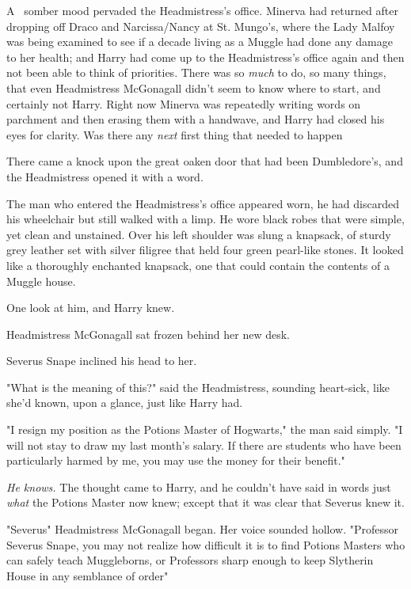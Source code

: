 
\lettrine{A}{~} somber mood
pervaded the Headmistress's office. Minerva had returned after dropping off
Draco and Narcissa/Nancy at St. Mungo's, where the Lady Malfoy was being
examined to see if a decade living as a Muggle had done any damage to her
health; and Harry had come up to the Headmistress's office again and
then{\el} not been able to think of priorities. There was so \emph{much} to
do, so many things, that even Headmistress McGonagall didn't seem to know where
to start, and certainly not Harry. Right now Minerva was repeatedly writing
words on parchment and then erasing them with a handwave, and Harry had closed
his eyes for clarity. Was there any \emph{next} first thing that needed to
happen{\el}

There came a knock upon the great oaken door that had been Dumbledore's, and
the Headmistress opened it with a word.

The man who entered the Headmistress's office appeared worn, he had discarded
his wheelchair but still walked with a limp. He wore black robes that were
simple, yet clean and unstained. Over his left shoulder was slung a knapsack,
of sturdy grey leather set with silver filigree that held four green pearl-like
stones. It looked like a thoroughly enchanted knapsack, one that could contain
the contents of a Muggle house.

One look at him, and Harry knew.

Headmistress McGonagall sat frozen behind her new desk.

Severus Snape inclined his head to her.

"What is the meaning of this?" said the Headmistress, sounding{\el}
heart-sick, like she'd known, upon a glance, just like Harry had.

"I resign my position as the Potions Master of Hogwarts," the man said simply.
"I will not stay to draw my last month's salary. If there are students who have
been particularly harmed by me, you may use the money for their benefit."

\emph{He knows.} The thought came to Harry, and he couldn't have said in words
just \emph{what} the Potions Master now knew; except that it was clear that
Severus knew it.

"Severus{\el}" Headmistress McGonagall began. Her voice sounded hollow.
"Professor Severus Snape, you may not realize how difficult it is to find
Potions Masters who can safely teach Muggleborns, or Professors sharp enough to
keep Slytherin House in any semblance of order{\el}"

